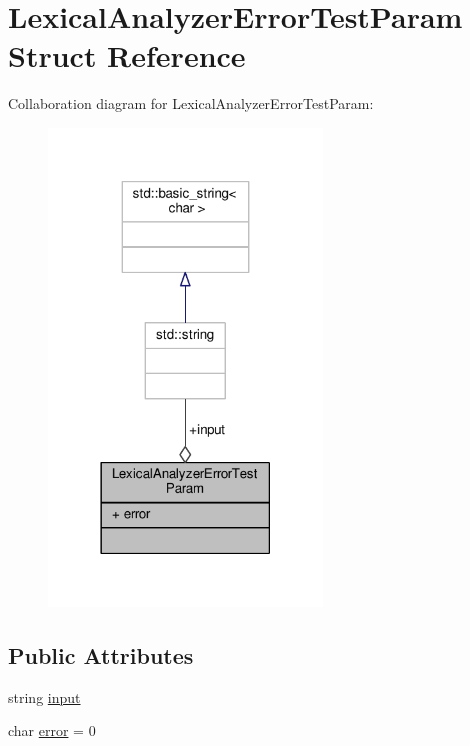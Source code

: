 \hypertarget{struct_lexical_analyzer_error_test_param}{}\section{Lexical\+Analyzer\+Error\+Test\+Param Struct Reference}
\label{struct_lexical_analyzer_error_test_param}


Collaboration diagram for Lexical\+Analyzer\+Error\+Test\+Param\+:
\nopagebreak
\begin{figure}[H]
\begin{center}
\leavevmode
\includegraphics[width=206pt]{struct_lexical_analyzer_error_test_param__coll__graph}
\end{center}
\end{figure}
\subsection*{Public Attributes}
\begin{DoxyCompactItemize}
\item 
string \hyperlink{struct_lexical_analyzer_error_test_param_ab55190d65d3bcaab962dcbe15bd60953}{input}
\item 
char \hyperlink{struct_lexical_analyzer_error_test_param_aab37ca9d0544a4299b23e2c77f9c309c}{error} = \textquotesingle{}0\textquotesingle{}
\end{DoxyCompactItemize}
